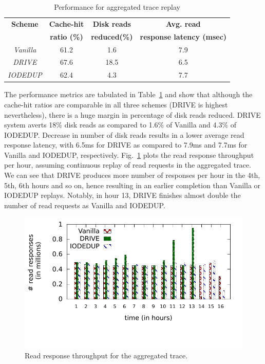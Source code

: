 \begin{table}[h]
\caption{Performance for aggregated trace replay}
\label{tab:aggregate-hw}
\centering
\begin{tabular}{|c|c|c|c|} \hline
\textbf{Scheme} & \textbf{Cache-hit} & \textbf{Disk reads} & \textbf{Avg. read}  \\
\textbf{} & \textbf{ratio (\%)} & \textbf{reduced(\%)} & \textbf{response latency (msec)}  \\ \hline
\textit{Vanilla} & 61.2 & 1.6 & 7.9 \\ \hline
\textit{DRIVE} & 67.6 & 18.5 & 6.5 \\ \hline
\textit{IODEDUP} & 62.4 & 4.3  & 7.7 \\ \hline
\end{tabular}
\end{table}

The performance metrics are tabulated in 
Table~\ref{tab:aggregate-hw} and show that although the cache-hit ratios
are comparable in all three schemes (DRIVE is highest nevertheless),
there is a huge margin in percentage of disk reads reduced. DRIVE system
averts 18\% disk reads as compared to 1.6\% of Vanilla and 4.3\% of IODEDUP.
Decrease in number of disk reads results in a lower average 
read response latency, with 6.5ms for DRIVE as compared to
7.9ms and 7.7ms for Vanilla and IODEDUP, respectively.
Fig.~\ref{fig:aggregate-hw-time-series} plots the read response throughput
per hour, assuming continuous replay of read requests in the aggregated trace.
We can see that DRIVE produces more number of responses per hour in the 4th,
5th, 6th hours and so on, hence resulting in an earlier completion than
Vanilla or IODEDUP replays. Notably, in hour 13, DRIVE finishes almost
double the number of read requests as Vanilla and IODEDUP.

\begin{figure}[h]
\centering
\includegraphics[scale=0.90]{confided-figures/aggregate-hw-replay/reads-writes/timeseriesperf-hour.pdf}
\vspace{-0.6in}
\caption{Read response throughput for the aggregated trace.}
\label{fig:aggregate-hw-time-series}
\end{figure}

